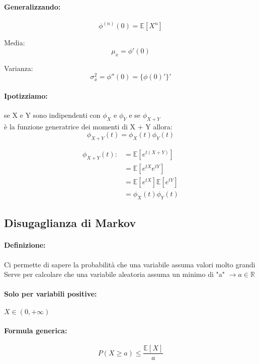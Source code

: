 \documentclass[]{article}
\newcommand{\ev}{\mathbb{E}[X]}
\renewcommand{\ev}[1]{\mathbb{E}[#1]}
\newcommand{\definizione}{\paragraph{Definizione:}}
\newcommand{\formula}{\paragraph{Formula generica:}}
\begin{document}
    \paragraph{Generalizzando:}
    \[ \phi^{(n)}(0) = \ev{X^n} \]
    \linebreak[2]

    \begin{minipage}{0.45\linewidth}
        Media:
        \[\mu_x = \phi'(0)\]
    \end{minipage}
    \begin{minipage}{0.45\linewidth}
        Varianza:
        \[ \sigma^{2}_x = \phi''(0) = \{\phi(0)'\}' \]
    \end{minipage}

    \paragraph{Ipotizziamo:} se X e Y sono indipendenti con $\phi_X$ e $\phi_Y$ e se $\phi_{X + Y}$ \\
    è la funzione generatrice dei momenti di X + Y allora:
    \[ \phi_{X + Y}(t) = \phi_X(t) \phi_Y(t) \]

    \begin{equation*}
        \begin{split}
            \phi_{X + Y}(t) :&= \ev{e^{t(X + Y)}} \\
            & = \ev{e^{tX} e^{tY}} \\
            & = \ev{e^{tX}} \ev{e^{tY}} \\
            & = \phi_X(t) \phi_Y(t)
        \end{split}
    \end{equation*}
    


    \subsection{Disugaglianza di Markov}
    \definizione Ci permette di sapere la probabilità che una variabile assuma valori molto grandi \\
    Serve per calcolare che una variabile aleatoria assuma un minimo di "a" $\longrightarrow a \in \mathbb{R}$

    \paragraph{Solo per variabili positive:} $X \in (0, +\infty) $
    \formula \[ P(X \geq a) \leq \frac{\ev{X}}{a}\]
\end{document}
